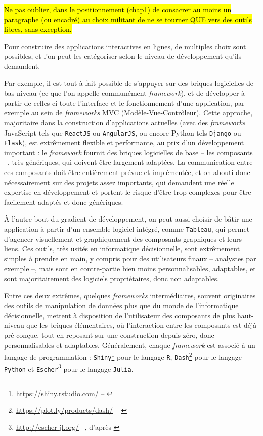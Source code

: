 	\hl{Ne pas oublier, dans le positionnement (chap1) de consacrer au moins un paragraphe (ou encadré) au choix \og militant\fg{} de ne se tourner QUE vers des outils libres, sans exception.}
	
	Pour construire des applications interactives en lignes, de multiples choix sont possibles, et l'on peut les catégoriser selon le niveau de développement qu'ils demandent.
	
	Par exemple, il est tout à fait possible de s'appuyer sur des briques logicielles de bas niveau (ce que l'on appelle communément \textit{framework}), et de développer à partir de celles-ci toute l'interface et le fonctionnement d'une application, par exemple au sein de \textit{frameworks} \og MVC\fg{} (Modèle-Vue-Contrôleur).
	Cette approche, majoritaire dans la construction d'applications actuelles (avec des \textit{frameworks} JavaScript tels que \texttt{ReactJS} ou \texttt{AngularJS}, ou encore Python tels \texttt{Django} ou \texttt{Flask}), est extrêmement flexible et performante, au prix d'un développement important : le \textit{framework} fournit des \og briques\fg{} logicielles de base -- les composants --, très génériques, qui doivent être largement adaptées.
	La communication entre ces composants doit être entièrement prévue et implémentée, et on abouti donc nécessairement sur des projets assez importants, qui demandent une réelle expertise en développement et portent le risque d'être trop complexes pour être facilement adaptés et donc génériques.
	
	À l'autre bout du gradient de développement, on peut aussi choisir de bâtir une application à partir d'un ensemble logiciel intégré, comme \texttt{Tableau}, qui permet d'agencer visuellement et graphiquement des composants graphiques et leurs liens. Ces outils, très usités en informatique décisionnelle, sont extrêmement simples à prendre en main, y compris pour des \og utilisateurs finaux\fg{} -- analystes par exemple --, mais sont en contre-partie bien moins personnalisables, adaptables, et sont majoritairement des logiciels propriétaires, donc non adaptables.
	
	Entre ces deux extrêmes, quelques \textit{frameworks} intermédiaires, souvent originaires des outils de manipulation de données plus que du monde de l'informatique décisionnelle, mettent à disposition de l'utilisateur des composants de plus haut-niveau que les \og briques élémentaires\fg{}, où l'interaction entre les composants est déjà pré-conçue, tout en reposant sur une construction \og depuis zéro\fg{}, donc personnalisables et adaptables.
	Généralement, chaque \textit{framework} est associé à un langage de programmation : \texttt{Shiny}\footnote{\href{https://shiny.rstudio.com/}{https://shiny.rstudio.com/} -- \cite{chang_shiny_2015}} pour le langage \texttt{R}, \texttt{Dash}\footnote{\href{https://plot.ly/products/dash/}{https://plot.ly/products/dash/} -- \cite{plotly_introducing_2017}} pour le langage \texttt{Python} et \texttt{Escher}\footnote{\href{http://escher-jl.org/}{http://escher-jl.org/}-- \cite{gowda_escher_2018}, d'après \cite{bezanson_julia_2014}} pour le langage \texttt{Julia}.
	
